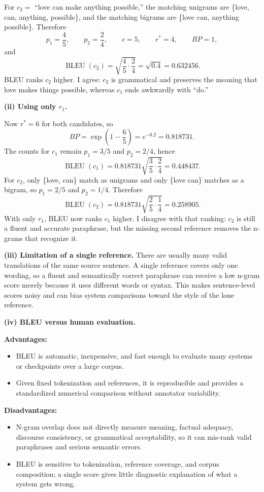 \documentclass[10pt]{article}
\begin{document}
For $c_2=$ ``love can make anything possible,'' the matching unigrams are \{love, can, anything, possible\}, and the matching bigrams are \{love can, anything possible\}. Therefore
\[
p_1=\frac{4}{5},\qquad p_2=\frac{2}{4},\qquad c=5,\qquad r^*=4,\qquad BP=1,
\]
and
\[
\operatorname{BLEU}(c_2)=\sqrt{\frac45\cdot\frac24}=\sqrt{0.4}=0.632456.
\]
BLEU ranks $c_2$ higher. I agree: $c_2$ is grammatical and preserves the meaning that love makes things possible, whereas $c_1$ ends awkwardly with ``do.''

\textbf{(ii) Using only $r_1$.}

Now $r^*=6$ for both candidates, so
\[
BP=\exp\left(1-\frac65\right)=e^{-0.2}=0.818731.
\]
The counts for $c_1$ remain $p_1=3/5$ and $p_2=2/4$, hence
\[
\operatorname{BLEU}(c_1)=0.818731\sqrt{\frac35\cdot\frac24}=0.448437.
\]
For $c_2$, only \{love, can\} match as unigrams and only \{love can\} matches as a bigram, so $p_1=2/5$ and $p_2=1/4$. Therefore
\[
\operatorname{BLEU}(c_2)=0.818731\sqrt{\frac25\cdot\frac14}=0.258905.
\]
With only $r_1$, BLEU now ranks $c_1$ higher. I disagree with that ranking: $c_2$ is still a fluent and accurate paraphrase, but the missing second reference removes the n-grams that recognize it.

\textbf{(iii) Limitation of a single reference.}
There are usually many valid translations of the same source sentence. A single reference covers only one wording, so a fluent and semantically correct paraphrase can receive a low n-gram score merely because it uses different words or syntax. This makes sentence-level scores noisy and can bias system comparisons toward the style of the lone reference.

\textbf{(iv) BLEU versus human evaluation.}

\textbf{Advantages:}
\begin{itemize}
  \item BLEU is automatic, inexpensive, and fast enough to evaluate many systems or checkpoints over a large corpus.
  \item Given fixed tokenization and references, it is reproducible and provides a standardized numerical comparison without annotator variability.
\end{itemize}

\textbf{Disadvantages:}
\begin{itemize}
  \item N-gram overlap does not directly measure meaning, factual adequacy, discourse consistency, or grammatical acceptability, so it can mis-rank valid paraphrases and serious semantic errors.
  \item BLEU is sensitive to tokenization, reference coverage, and corpus composition; a single score gives little diagnostic explanation of what a system gets wrong.
\end{itemize}
\end{document}
